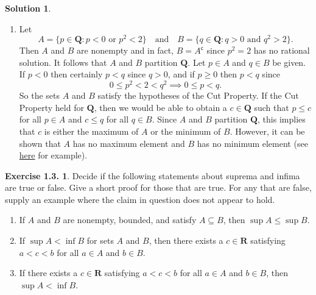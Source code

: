 \documentclass[12pt]{article}
\theoremstyle{definition}
\theoremstyle{exercise}
\newtheorem{exercise}{Exercise 1.3.}
\theoremstyle{solution}
\newtheorem*{solution}{Solution}
\newcommand{\setcomp}[1]{#1^{\mathsf{c}}}
\newcommand{\Q}{\mathbf{Q}}
\begin{document}
\begin{solution}
\begin{enumerate}
        \item Let
        \[
            A = \{ p \in \Q : p < 0 \text{ or } p^2 < 2 \} \quad \text{and} \quad B = \{ q \in \Q : q > 0 \text{ and } q^2 > 2 \}.
        \]
        Then \( A \) and \( B \) are nonempty and in fact, \( B = \setcomp{A} \) since \( p^2 = 2 \) has no rational solution. It follows that \( A \) and \( B \) partition \( \Q \). Let \( p \in A \) and \( q \in B \) be given. If \( p < 0 \) then certainly \( p < q \) since \( q > 0 \), and if \( p \geq 0 \) then \( p < q \) since
        \[
            0 \leq p^2 < 2 < q^2 \implies 0 \leq p < q.
        \]
        So the sets \( A \) and \( B \) satisfy the hypotheses of the Cut Property. If the Cut Property held for \( \Q \), then we would be able to obtain a \( c \in \Q \) such that \( p \leq c \) for all \( p \in A \) and \( c \leq q \) for all \( q \in B \). Since \( A \) and \( B \) partition \( \Q \), this implies that \( c \) is either the maximum of \( A \) or the minimum of \( B \). However, it can be shown that \( A \) has no maximum element and \( B \) has no minimum element (see \href{https://lew98.github.io/Mathematics/Q_does_not_have_the_least_upper_bound_property.pdf}{here} for example).
    \end{enumerate}
\end{solution}

\begin{exercise}
\label{ex:11}
    Decide if the following statements about suprema and infima are true or false. Give a short proof for those that are true. For any that are false, supply an example where the claim in question does not appear to hold.
    \begin{enumerate}
        \item If \( A \) and \( B \) are nonempty, bounded, and satisfy \( A \subseteq B \), then \( \sup A \leq \sup B \).

        \item If \( \sup A < \inf B \) for sets \( A \) and \( B \), then there exists a \( c \in \mathbf{R} \) satisfying \( a < c < b \) for all \( a \in A \) and \( b \in B \).

        \item If there exists a \( c \in \mathbf{R} \) satisfying \( a < c < b \) for all \( a \in A \) and \( b \in B \), then \( \sup A < \inf B \).
    \end{enumerate}
\end{exercise}
\end{document}

